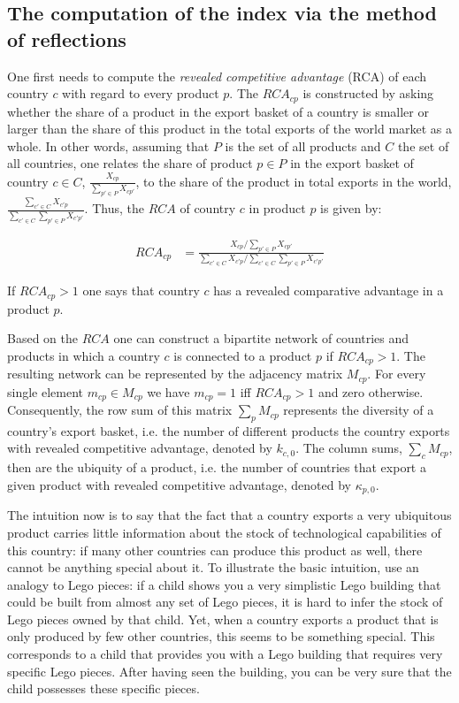 \documentclass[abstract=on]{scrartcl}
\begin{document}
\subsection{The computation of the index via the method of reflections}

One first needs to compute the \textit{revealed competitive advantage} (RCA) of each country $c$ with regard to every product $p$.
The $RCA_{cp}$ is constructed by asking whether the share of a product in the export basket of a country is smaller or larger than the share of this product in the total exports of the world market as a whole.
In other words, assuming that $P$ is the set of all products and $C$ the set of all countries, one relates the share of product $p\in P$ in the export basket of country $c\in C$, $\frac{X_{cp}}{\sum_{p'\in P}X_{cp'}}$, to the share of the product in total exports in the world, $\frac{\sum_{c'\in C}X_{c'p}}{\sum_{c'\in C}\sum_{p'\in P}X_{c'p'}}$.
Thus, the $RCA$ of country $c$ in product $p$ is given by:

\begin{align}
RCA_{cp}&=\frac{X_{cp} / \sum_{p'\in P}X_{cp'}}{\sum_{c'\in C}X_{c'p}/\sum_{c'\in C}\sum_{p'\in P}X_{c'p'}}
\end{align}

If $RCA_{cp}>1$ one says that country $c$ has a revealed comparative advantage in a product $p$.

Based on the $RCA$ one can construct a bipartite network of countries and products in which a country $c$ is connected to a product $p$ if $RCA_{cp}>1$. 
The resulting network can be represented by the adjacency matrix $M_{cp}$.
For every single element $m_{cp}\in M_{cp}$ we have $m_{cp} = 1$ iff $RCA_{cp}>1$ and zero otherwise.
Consequently, the row sum of this matrix $\sum_pM_{cp}$ represents the diversity of a country's export basket, i.e. the number of different products the country exports with revealed competitive advantage, denoted by $k_{c,0}$.
The column sums, $\sum_cM_{cp}$, then are the ubiquity of a product, i.e. the number of countries that export a given product with revealed competitive advantage, denoted by $\kappa_{p,0}$.

The intuition now is to say that the fact that a country exports a very ubiquitous product carries little information about the stock of technological capabilities of this country:
if many other countries can produce this product as well, there cannot be anything special about it.
To illustrate the basic intuition, \citet{Hidalgo:2009be} use an analogy to Lego pieces:
if a child shows you a very simplistic Lego building that could be built from almost any set of Lego pieces, it is hard to infer the stock of Lego pieces owned by that child.
Yet, when a country exports a product that is only produced by few other countries, this seems to be something special.
This corresponds to a child that provides you with a Lego building that requires very specific Lego pieces. 
After having seen the building, you can be very sure that the child possesses these specific pieces.
\end{document}
